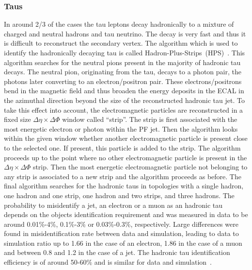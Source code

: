 \subsubsection{Taus}

In around 2/3 of the cases the tau leptons decay hadronically to a mixture of charged and neutral hadrons and tau neutrino. The decay is very fast and thus it is difficult to reconstruct the secondary vertex. The algorithm which is used to identify the hadronically decaying tau is called Hadron-Plus-Strips~(HPS)~\cite{CMS:2016gvn}. This algorithm searches for the neutral pions present in the majority of hadronic tau decays. The neutral pion, originating from the tau, decays to a photon pair, the photons later converting to an electron/positron pair. These electrons/positrons bend in the magnetic field and thus broaden the energy deposits in the ECAL in the azimuthal direction beyond the size of the reconstructed hadronic tau jet. To take this effect into account, the electromagnetic particles  are reconstructed in a fixed size $\Delta \eta \times \Delta \Phi$ window called ``strip''. The strip is first associated with the most energetic electron or photon within the PF jet. Then the algorithm looks within the given window whether another electromagnetic particle is present close to the selected one. If present, this particle is added to the strip. The algorithm proceeds up to the point where no other electromagnetic particle is present in the $\Delta \eta \times \Delta \Phi$ strip. Then the most energetic electromagnetic particle not belonging to any strip is associated to a new strip and the algorithm proceeds as before. The final algorithm searches for the hadronic taus in topologies with a single hadron, one hadron and one strip, one hadron and two strips, and three hadrons. The probability to misidentify a jet, an electron or a muon as an hadronic tau  depends on the objects identification requirement and was measured in data to be around 0.01\%-4\%, 0.1\%-3\% or 0.03\%-0.3\%, respectively. Large differences were found in misidentification rate between data and simulation, leading to data to simulation ratio up to 1.66 in the case of an electron, 1.86 in the case of a muon and between 0.8 and 1.2 in the case of a jet. The hadronic tau identification efficiency is of around 50-60\% and is similar for data and simulation~\cite{Khachatryan:2015dfa}.



